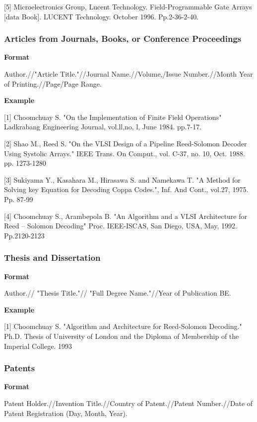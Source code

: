 [5] Microelectronics Group, Lucent Technology. Field-Programmable Gate Arrays [data Book]. LUCENT Technology. October 1996. Pp.2-36-2-40.

\subsubsection{Articles from Journals, Books, or Conference Proceedings}

\textbf{Format}

Author.//"Article Title."//Journal Name.//Volume,/Issue Number.//Month Year of Printing.//Page/Page Range.

\textbf{Example}

[1] Choomchuay S. "On the Implementation of Finite Field Operations" Ladkrabang Engineering Journal, vol.ll,no, l, June 1984. pp.7-17.

[2] Shao M., Reed S. "On the VLSI Design of a Pipeline Reed-Solomon Decoder Using Systolic Arrays." IEEE Trans. On Comput., vol. C-37, no. 10, Oct. 1988. pp. 1273-1280

[3] Sukiyama Y., Kasahara M., Hirasawa S. and Namekawa T. "A Method for Solving key Equation for Decoding Coppa Codes.", Inf. And Cont., vol.27, 1975. Pp. 87-99

[4] Choomchuay S., Arambepola B. "An Algorithm and a VLSI Architecture for Reed – Solomon Decoding" Proc. IEEE-ISCAS, San Diego, USA, May, 1992. Pp.2120-2123

\subsubsection{Thesis and Dissertation}

\textbf{Format}

Author.// "Thesis Title."// "Full Degree Name."//Year of Publication BE.

\textbf{Example}

[1] Choomchuay S. "Algorithm and Architecture for Reed-Solomon Decoding." Ph.D. Thesis of University of London and the Diploma of Membership of the Imperial College. 1993

\subsubsection{Patents}

\textbf{Format}

Patent Holder.//Invention Title.//Country of Patent.//Patent Number.//Date of Patent Registration (Day, Month, Year).

